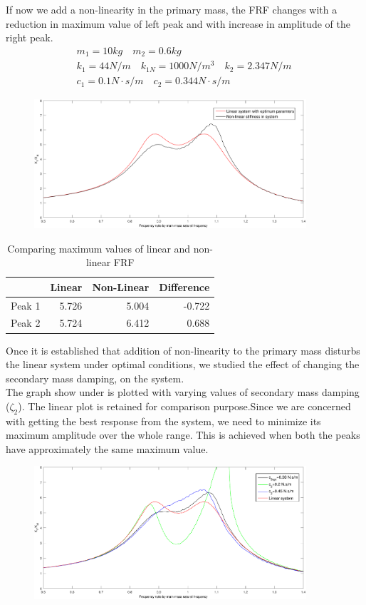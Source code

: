 If now we add a non-linearity in the primary mass,
the FRF changes with a reduction in maximum value of left peak and with increase in amplitude of the right peak.
\begin{align}
&m_1 = 10kg\quad m_2 = 0.6kg\quad \\
&k_1=44 N/m\quad
k_{1N} = 1000 N/m^3\quad k_2 = 2.347 N/m \quad \\
&c_1 = 0.1 N\cdot s/m \quad
c_2 = 0.344 N\cdot s/m 
\end{align}
\begin{figure}[h!]
\includegraphics[width=0.9\textwidth]{"figures/nonlinear"}
\end{figure}
\begin{table}
\centering
\caption{Comparing maximum values of linear and non-linear FRF}
\begin{tabular}{|r|r|r|r|}
\hline
 & Linear & Non-Linear & Difference \\ \hline
Peak 1 & 5.726 & 5.004 & -0.722\\
Peak 2 & 5.724  & 6.412 & 0.688\\ \hline
\end{tabular}
\end{table}
Once it is established that addition of non-linearity to the primary mass disturbs the linear system under optimal conditions, we studied the effect of changing the secondary mass damping, on the system.\\
The graph show under is plotted with varying values of secondary mass damping ($\zeta_2$). The linear plot is retained for comparison purpose.Since we are concerned with getting the best response from the system, we need to minimize its maximum amplitude over the whole range. This is achieved when both the peaks have approximately the same maximum value.\\[0.2in]
\begin{figure}[h!]
\includegraphics[width=0.9\textwidth]{"figures/change"}\\[0.2in] 
\end{figure}
